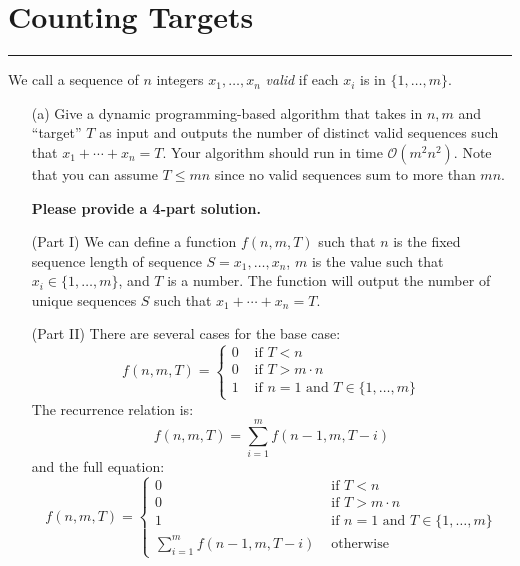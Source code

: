\documentclass{article}
\begin{document}
\newpage
\section*{Counting Targets}
\hrule

We call a sequence of $n$ integers $x_{1}, \ldots, x_{n}$ \textit{valid} if each $x_{i}$ is in $\{1, \ldots, m\}$.
    \begin{itemize}
        \item [(a)] Give a dynamic programming-based algorithm that takes in $n, m$ and ``target'' $T$ as input and outputs the number of distinct valid sequences such that $x_{1} + \cdots + x_{n} = T$. Your algorithm should run in time $\mathcal{O}(m^{2}n^{2})$. Note that you can assume $T \leq mn$ since no valid sequences sum to more than $mn$.

        \textbf{Please provide a 4-part solution.}
            \begin{answer}
                (Part I) We can define a function $f(n, m, T)$ such that $n$ is the fixed sequence length of sequence $S = x_{1}, \ldots, x_{n}$, $m$ is the value such that $x_{i} \in \{1, \ldots, m\}$, and $T$ is a number. The function will output the number of unique sequences $S$ such that $x_{1} + \cdots + x_{n} = T$.

                (Part II) There are several cases for the base case:
                    \begin{equation*}
                        f(n, m, T) = \begin{cases}
                            0 &\text{ if } T < n \\
                            0 &\text{ if } T > m \cdot n \\
                            1 &\text{ if } n = 1 \text{ and } T \in \{1, \ldots, m\}    
                        \end{cases}
                    \end{equation*}
                The recurrence relation is:
                    \begin{equation*}
                        f(n, m, T) = \sum_{i = 1}^{m} f(n - 1, m, T - i)
                    \end{equation*}
                and the full equation:
                    \begin{equation*}
                        f(n, m, T) = \begin{cases}
                            0 &\text{ if } T < n \\
                            0 &\text{ if } T > m \cdot n \\
                            1 &\text{ if } n = 1 \text{ and } T \in \{1, \ldots, m\} \\
                            \sum_{i = 1}^{m} f(n - 1, m, T - i) & \text{ otherwise }
                        \end{cases}
                    \end{equation*}


\end{answer}
\end{itemize}
\end{document}
